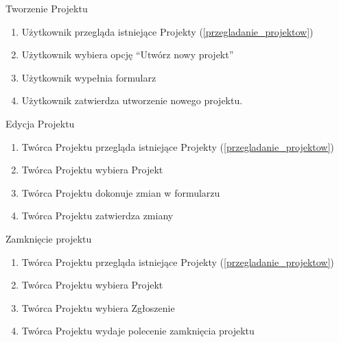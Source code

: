 \begin{usecase}{Tworzenie Projektu}
\label{tworzenie_projektu}
	\begin{enumerate}
    \item Użytkownik przegląda istniejące Projekty (\ref{przegladanie_projektow})
    \item Użytkownik wybiera opcję  “Utwórz nowy projekt”
    \item Użytkownik wypełnia formularz
    \item Użytkownik zatwierdza utworzenie nowego projektu.
	\end{enumerate}
\end{usecase}

\begin{usecase}{Edycja Projektu}
	\begin{enumerate}
    \item Twórca Projektu przegląda istniejące Projekty (\ref{przegladanie_projektow})
    \item Twórca Projektu wybiera Projekt
    \item Twórca Projektu dokonuje zmian w formularzu
    \item Twórca Projektu zatwierdza zmiany
	\end{enumerate}
\end{usecase}


\begin{usecase}{Zamknięcie projektu}
	\begin{enumerate}
	\item Twórca Projektu przegląda istniejące Projekty (\ref{przegladanie_projektow})
    \item Twórca Projektu wybiera Projekt
    \item Twórca Projektu wybiera Zgłoszenie
    \item Twórca Projektu wydaje polecenie zamknięcia projektu
	\end{enumerate}
\end{usecase}



